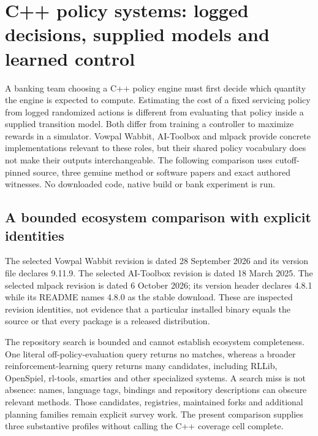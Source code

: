 \section{C++ policy systems: logged decisions, supplied models and learned control}
\label{sec:exec24-policy-cxx}
A banking team choosing a C++ policy engine must first decide which quantity the engine is expected to compute. Estimating the cost of a fixed servicing policy from logged randomized actions is different from evaluating that policy inside a supplied transition model. Both differ from training a controller to maximize rewards in a simulator. Vowpal Wabbit, AI-Toolbox and mlpack provide concrete implementations relevant to these roles, but their shared policy vocabulary does not make their outputs interchangeable. The following comparison uses cutoff-pinned source, three genuine method or software papers and exact authored witnesses. No downloaded code, native build or bank experiment is run.~\citep{exec24_policycxx_vw,exec24_policycxx_aitoolbox,exec24_policycxx_mlpack,exec24_policycxx_comparison}

\subsection{A bounded ecosystem comparison with explicit identities}
The selected Vowpal Wabbit revision is dated 28 September 2026 and its version file declares 9.11.9. The selected AI-Toolbox revision is dated 18 March 2025. The selected mlpack revision is dated 6 October 2026; its version header declares 4.8.1 while its README names 4.8.0 as the stable download. These are inspected revision identities, not evidence that a particular installed binary equals the source or that every package is a released distribution.~\citep{exec24_policycxx_vw,exec24_policycxx_aitoolbox,exec24_policycxx_mlpack}

The repository search is bounded and cannot establish ecosystem completeness. One literal off-policy-evaluation query returns no matches, whereas a broader reinforcement-learning query returns many candidates, including RLLib, OpenSpiel, rl-tools, smarties and other specialized systems. A search miss is not absence: names, language tags, bindings and repository descriptions can obscure relevant methods. Those candidates, registries, maintained forks and additional planning families remain explicit survey work. The present comparison supplies three substantive profiles without calling the C++ coverage cell complete.~\citep{exec24_policycxx_comparison}

